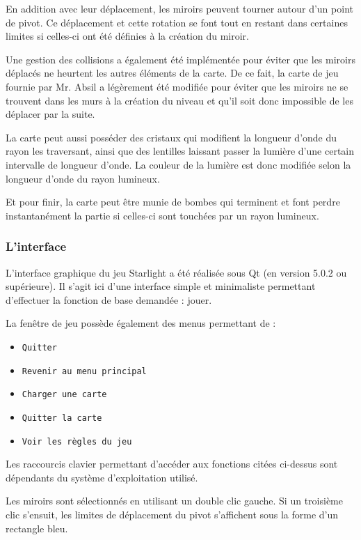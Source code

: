 \documentclass[]{report}
\begin{document}
En addition avec leur déplacement, les miroirs peuvent tourner
autour d'un point de pivot.
Ce déplacement et cette rotation se font tout en restant
dans certaines limites si celles-ci ont été définies à la création du miroir.

Une gestion des collisions a également été implémentée pour
éviter que les miroirs déplacés ne heurtent les autres éléments de la carte.
De ce fait, la carte de jeu fournie par Mr. Absil a légèrement été modifiée
pour éviter que les miroirs ne se trouvent dans les murs à la création du niveau
et qu'il soit donc impossible de les déplacer par la suite.

La carte peut aussi posséder des cristaux qui modifient la longueur d'onde
du rayon les traversant, ainsi que des lentilles laissant passer la lumière
d'une certain intervalle de longueur d'onde.
La couleur de la lumière est donc modifiée selon la longueur d'onde 
du rayon lumineux.

Et pour finir, la carte peut être munie de bombes qui terminent et font perdre
instantanément la partie si celles-ci sont touchées par un rayon lumineux. 


\subsubsection{L'interface}

L'interface graphique du jeu Starlight a été réalisée sous Qt (en version 5.0.2 ou supérieure).
Il s'agit ici d'une interface simple et minimaliste permettant d'effectuer la fonction de base 
demandée : jouer.

La fenêtre de jeu possède également des menus permettant de :

\begin{itemize}
    \item \texttt{Quitter}
    \item \texttt{Revenir au menu principal}
    \item \texttt{Charger une carte}
    \item \texttt{Quitter la carte}
    \item \texttt{Voir les règles du jeu}
\end{itemize}

Les raccourcis clavier permettant d'accéder aux fonctions citées ci-dessus sont dépendants
du système d'exploitation utilisé.

Les miroirs sont sélectionnés en utilisant un double clic gauche.
Si un troisième clic s’ensuit, les limites de déplacement du pivot s'affichent
sous la forme d'un rectangle bleu.
\end{document}

